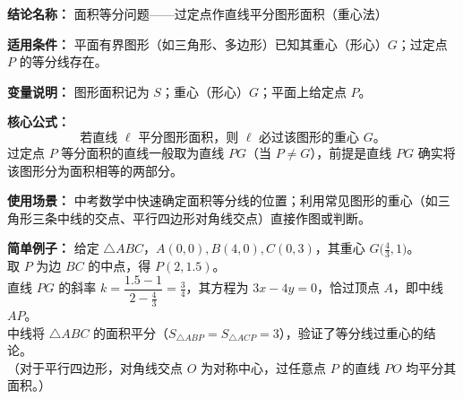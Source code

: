 \textbf{结论名称：} 面积等分问题——过定点作直线平分图形面积（重心法）

\textbf{适用条件：} 平面有界图形（如三角形、多边形）已知其重心（形心）$G$；过定点 $P$ 的等分线存在。

\textbf{变量说明：} 图形面积记为 $S$；重心（形心）$G$；平面上给定点 $P$。

\textbf{核心公式：} \[ \boxed{\text{若直线 } \ell \text{ 平分图形面积，则 } \ell \text{ 必过该图形的重心 } G。} \] 过定点 $P$ 等分面积的直线一般取为直线 $PG$（当 $P\neq G$），前提是直线 $PG$ 确实将该图形分为面积相等的两部分。

\textbf{使用场景：} 中考数学中快速确定面积等分线的位置；利用常见图形的重心（如三角形三条中线的交点、平行四边形对角线交点）直接作图或判断。

\textbf{简单例子：} 给定 $\triangle ABC$，$A(0,0), B(4,0), C(0,3)$，其重心 $G\bigl(\frac{4}{3},1\bigr)$。\\
取 $P$ 为边 $BC$ 的中点，得 $P(2,1.5)$。\\
直线 $PG$ 的斜率 $k=\dfrac{1.5-1}{2-\frac{4}{3}}=\frac{3}{4}$，其方程为 $3x-4y=0$，恰过顶点 $A$，即中线 $AP$。\\
中线将 $\triangle ABC$ 的面积平分（$S_{\triangle ABP}=S_{\triangle ACP}=3$），验证了等分线过重心的结论。\\
（对于平行四边形，对角线交点 $O$ 为对称中心，过任意点 $P$ 的直线 $PO$ 均平分其面积。）